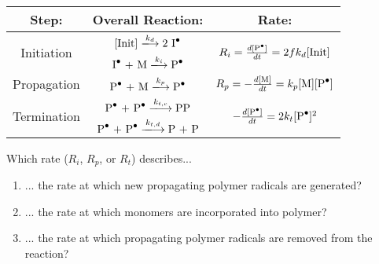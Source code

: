 \begin{activity}
\begin{model}
	\begin{center}
		\renewcommand{\arraystretch}{2}
		\begin{tabular}{c c c}
			\textbf{Step:} & \textbf{Overall Reaction:} & \textbf{Rate:}\\\hline
			\multirow{2}{*}{Initiation} & $[\text{Init}] \xlongrightarrow{k_d} \text{2 \ce{I^.}}$ & \multirow{2}{*}{$ R_i = \frac{d\text{[\ce{P^.}]}}{dt} = 2fk_d[\text{Init}]$}\\
			 & $\text{\ce{I^.} + M} \xlongrightarrow{k_i} \text{\ce{P^.}}$ & \\\hline
			Propagation & $\text{\ce{P^.} + M} \xlongrightarrow{k_p} \text{\ce{P^.}}$ & $R_p = -\frac{d[\text{M}]}{dt} = k_p\text{[M][\ce{P^.}]}$\\\hline
			\multirow{2}{*}{Termination} & $\text{\ce{P^.} + \ce{P^.}} \xlongrightarrow{k_{t,c}} \text{\ce{PP}}$ & \multirow{2}{*}{$-\frac{d[\text{\ce{P^.}}]}{dt} = 2k_t [\text{\ce{P^.}}]^2$}\\
			& $\text{\ce{P^.} + \ce{P^.}} \xlongrightarrow{k_{t,d}} \text{P + P}$ & \\\hline
		\end{tabular}
	\end{center}
	\vspace{6pt}

\end{model}

\begin{ctqs}

	\question Which rate ($R_i$, $R_p$, or $R_t$) describes...
	
		\begin{enumerate}
			\item ... the rate at which new propagating polymer radicals are generated?
			
				\begin{solution}[0.5in]
				\end{solution}
				
			\item ... the rate at which monomers are incorporated into polymer?
			
				\begin{solution}[0.5in]
				\end{solution}
				
			\item ... the rate at which propagating polymer radicals are removed from the reaction?
			
				\begin{solution}[0.5in]
				\end{solution}
				

\end{enumerate}
\end{ctqs}
\end{activity}
